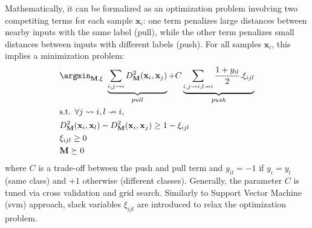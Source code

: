 %
Mathematically, it can be formalized as an optimization problem involving two competiting terms for each sample $\textbf{x}_i$: one term penalizes large distances between nearby inputs with the same label (pull), while the other term penalizes small distances between inputs with different labels (push). For all samples $\textbf{x}_i$, this implies a minimization problem:
\begin{equation}
\begin{aligned}
&\displaystyle 		\argmin_{\textbf{M},\xi} \text{  } \underbrace{
	\sum\limits_{i,j \rightsquigarrow i}
	D^2_\textbf{M}(\textbf{x}_i,\textbf{x}_j)
}_{pull}
+
C
\underbrace{
	\sum\limits_{i,j \rightsquigarrow i,l \nrightarrow i} \frac{1+y_{il}}{2}.\xi_{ijl}
}
_{push} \\
&\text{s.t.  } \forall j \rightsquigarrow i, l \nrightarrow i, \\
& D^2_\textbf{M}(\textbf{x}_i,\textbf{x}_l) - D^2_\textbf{M}(\textbf{x}_i,\textbf{x}_j)  \geq 1-\xi_{ijl} \\
& \xi_{ijl} \geq 0 \\
& \textbf{M} \succeq 0
\label{eq:OptimizationProblem}
\end{aligned}
\end{equation}
\noindent where $C$ is a trade-off between the push and pull term and $y_{il}=-1$ if $y_i=y_l$ (same class) and $+1$ otherwise (different classes). Generally, the parameter $C$ is tuned via cross validation and grid search. Similarly to Support Vector Machine ({\sc svm}) approach, slack variables $\xi_{ijl}$ are introduced to relax the optimization problem. 



